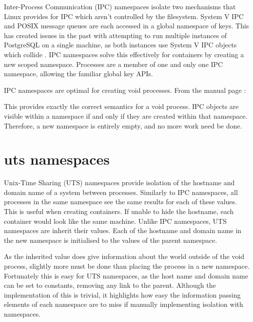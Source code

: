 \documentclass[12pt,a4paper,twoside]{report}
\begin{document}
Inter-Process Communication (IPC) namespaces isolate two mechanisms that Linux provides for IPC which aren't controlled by the filesystem. System V IPC and POSIX message queues are each accessed in a global namespace of keys. This has created issues in the past with attempting to run multiple instances of PostgreSQL on a single machine, as both instances use System V IPC objects which collide \citep[§4.3]{barham_xen_2003}. IPC namespaces solve this effectively for containers by creating a new scoped namespace. Processes are a member of one and only one IPC namespace, allowing the familiar global key APIs.

IPC namespaces are optimal for creating void processes. From the manual page \citep{free_software_foundation_ipc_namespaces7_2021}:


This provides exactly the correct semantics for a void process. IPC objects are visible within a namespace if and only if they are created within that namespace. Therefore, a new namespace is entirely empty, and no more work need be done.


\section{uts namespaces}
\label{sec:voiding-uts}

Unix-Time Sharing (UTS) namespaces provide isolation of the hostname and domain name of a system between processes. Similarly to IPC namespaces, all processes in the same namespace see the same results for each of these values. This is useful when creating containers. If unable to hide the hostname, each container would look like the same machine. Unlike IPC namespaces, UTS namespaces are inherit their values. Each of the hostname and domain name in the new namespace is initialised to the values of the parent namespace.

As the inherited value does give information about the world outside of the void process, slightly more must be done than placing the process in a new namespace. Fortunately this is easy for UTS namespaces, as the host name and domain name can be set to constants, removing any link to the parent. Although the implementation of this is trivial, it highlights how easy the information passing elements of each namespace are to miss if manually implementing isolation with namespaces.
\end{document}
